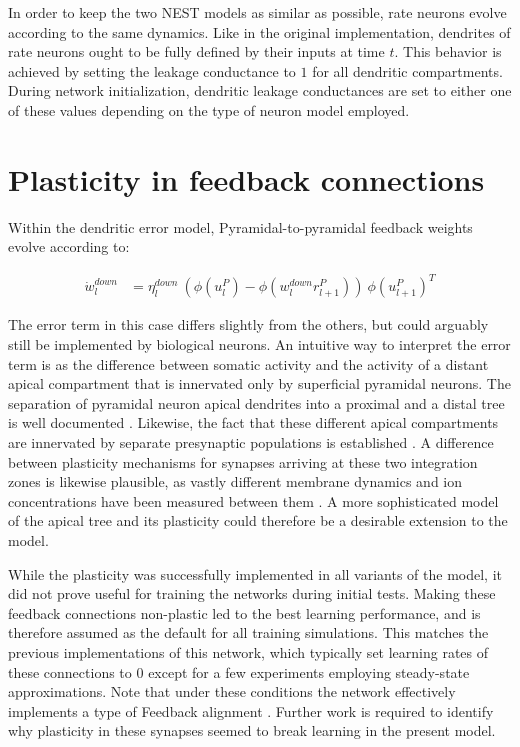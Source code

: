 In order to keep the two NEST models as similar as possible, rate neurons evolve according to the same dynamics. Like in
the original implementation, dendrites of rate neurons ought to be fully defined by their inputs at time $t$. This
behavior is achieved by setting the leakage conductance to $1$ for all dendritic compartments. During network
initialization, dendritic leakage conductances are set to either one of these values depending on the type of neuron
model employed.


\section{Plasticity in feedback connections}\label{sec-feedback-plast}

Within the dendritic error model, Pyramidal-to-pyramidal feedback weights evolve according to:

\begin{align}
  \dot{w}_{l}^{down} & = \eta_l^{down} \ ( \phi(u_l^{P}) - \phi(w_l^{down} r_{l+1}^P) )\ \phi(u_{l+1}^{P})^T
\end{align}

The error term in this case differs slightly from the others, but could arguably still be implemented by biological
neurons. An intuitive way to interpret the error term is as the difference between somatic activity and the activity of
a distant apical compartment that is innervated only by superficial pyramidal neurons. The separation of pyramidal
neuron apical dendrites into a proximal and a distal tree is well documented \citep{Ishizuka1995}. Likewise, the fact
that these different apical compartments are innervated by separate presynaptic populations is established
\citep{Larkum2018}. A difference between plasticity mechanisms for synapses arriving at these two integration zones is
likewise plausible, as vastly different membrane dynamics and ion concentrations have been measured between them
\citep{Ishizuka1995,Larkum2022}. A more sophisticated model of the apical tree and its plasticity could therefore be a
desirable extension to the model.

While the plasticity was successfully implemented in all variants of the model, it did not prove useful for training the
networks during initial tests. Making these feedback connections non-plastic led to the best learning performance, and
is therefore assumed as the default for all training simulations. This matches the previous implementations of this
network, which typically set learning rates of these connections to $0$ except for a few experiments employing
steady-state approximations. Note that under these conditions the network effectively implements a type of Feedback
alignment \citep{Lillicrap2014}. Further work is required to identify why plasticity in these synapses seemed to break
learning in the present model.


